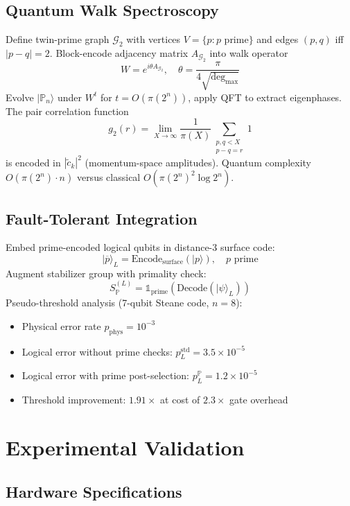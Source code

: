 \documentclass[11pt,letterpaper]{article}
\begin{document}
\subsection{Quantum Walk Spectroscopy}

Define twin-prime graph $\mathcal{G}_2$ with vertices $V = \{p : p \text{ prime}\}$ and edges $(p,q)$ iff $|p-q|=2$. Block-encode adjacency matrix $A_{\mathcal{G}_2}$ into walk operator
\[
W = e^{i\theta A_{\mathcal{G}_2}}, \quad \theta = \frac{\pi}{4\sqrt{\deg_{\max}}}
\]
Evolve $|\mathbb{P}_n\rangle$ under $W^t$ for $t = O(\pi(2^n))$, apply QFT to extract eigenphases. The pair correlation function
\[
g_2(r) = \lim_{X \to \infty} \frac{1}{\pi(X)} \sum_{\substack{p,q < X \\ p-q = r}} 1
\]
is encoded in $|\tilde{c}_k|^2$ (momentum-space amplitudes). Quantum complexity $O(\pi(2^n) \cdot n)$ versus classical $O(\pi(2^n)^2 \log 2^n)$.

\subsection{Fault-Tolerant Integration}

Embed prime-encoded logical qubits in distance-3 surface code:
\[
|\overline{p}\rangle_L = \text{Encode}_{\text{surface}}(|p\rangle), \quad p \text{ prime}
\]
Augment stabilizer group with primality check:
\[
S_{\mathbb{P}}^{(L)} = \mathbb{1}_{\text{prime}}(\text{Decode}(|\psi\rangle_L))
\]
Pseudo-threshold analysis (7-qubit Steane code, $n=8$):
\begin{itemize}
\item Physical error rate $p_{\text{phys}} = 10^{-3}$
\item Logical error without prime checks: $p_L^{\text{std}} = 3.5 \times 10^{-5}$
\item Logical error with prime post-selection: $p_L^{\mathbb{P}} = 1.2 \times 10^{-5}$
\item Threshold improvement: $1.91\times$ at cost of $2.3\times$ gate overhead
\end{itemize}

\section{Experimental Validation}

\subsection{Hardware Specifications}
\end{document}
